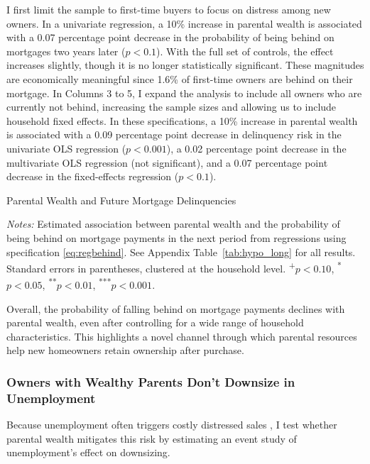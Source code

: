 \documentclass[12pt]{article}
\begin{document}
I first limit the sample to first-time buyers to focus on distress among new owners. In a univariate regression, a 10\% increase in parental wealth is associated with a 0.07 percentage point decrease in the probability of being behind on mortgages two years later ($p<0.1$). With the full set of controls, the effect increases slightly, though it is no longer statistically significant. These magnitudes are economically meaningful since 1.6\% of first-time owners are behind on their mortgage. In Columns 3 to 5, I expand the analysis to include all owners who are currently not behind, increasing the sample sizes and allowing us to include household fixed effects. In these specifications, a 10\% increase in parental wealth is associated with a 0.09 percentage point decrease in delinquency risk in the univariate OLS regression ($p<0.001$), a 0.02 percentage point decrease in the multivariate OLS regression (not significant), and a 0.07 percentage point decrease in the fixed-effects regression ($p<0.1$).

\begin{table}
	\centering
	\begin{threeparttable}
		\caption{Parental Wealth and Future Mortgage Delinquencies}
		\label{tab:hypo}
		\small 
				
	
	\end{threeparttable}
	{\begin{footnotesize}\begin{flushleft}
		\textit{Notes:} Estimated association between parental wealth and the probability of being behind on mortgage payments in the next period from regressions using specification \ref{eq:regbehind}. See Appendix Table~\ref{tab:hypo_long} for all results. Standard errors in parentheses, clustered at the household level. \textsuperscript{+}$p<0.10$, \textsuperscript{*}$p<0.05$, \textsuperscript{**}$p<0.01$, \textsuperscript{***}$p<0.001$.
		\end{flushleft}\end{footnotesize}}	
\end{table}

Overall, the probability of falling behind on mortgage payments declines with parental wealth, even after controlling for a wide range of household characteristics. This highlights a novel channel through which parental resources help new homeowners retain ownership after purchase.


\subsubsection{Owners with Wealthy Parents Don't Downsize in Unemployment}\label{sec:eventstudy}
Because unemployment often triggers costly distressed sales \citep{kermani2021racial,hsu2018unemployment}, I test whether parental wealth mitigates this risk by estimating an event study of unemployment’s effect on downsizing.
\end{document}

